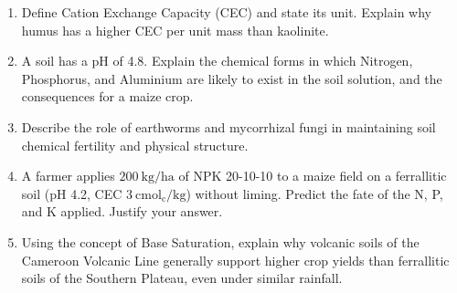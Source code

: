 \documentclass[11pt]{article}
\begin{document}
\begin{exercice}
\begin{enumerate}
    \item Define Cation Exchange Capacity (CEC) and state its unit. Explain why humus has a higher CEC per unit mass than kaolinite.
    \item A soil has a pH of 4.8. Explain the chemical forms in which Nitrogen, Phosphorus, and Aluminium are likely to exist in the soil solution, and the consequences for a maize crop.
    \item Describe the role of earthworms and mycorrhizal fungi in maintaining soil chemical fertility and physical structure.
    \item A farmer applies $200\ \mathrm{kg/ha}$ of NPK 20-10-10 to a maize field on a ferrallitic soil (pH 4.2, CEC $3\ \mathrm{cmol_c/kg}$) without liming. Predict the fate of the N, P, and K applied. Justify your answer.
    \item Using the concept of Base Saturation, explain why volcanic soils of the Cameroon Volcanic Line generally support higher crop yields than ferrallitic soils of the Southern Plateau, even under similar rainfall.
\end{enumerate}
\end{exercice}
\end{document}
